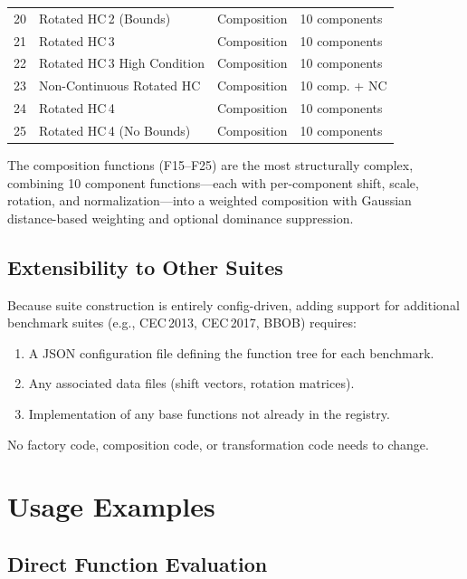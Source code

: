 \documentclass[11pt,a4paper]{article}
\begin{document}
\begin{table}[t]
\begin{tabular}{@{}clll@{}}
20 & Rotated HC\,2 (Bounds)                & Composition   & 10 components \\
21 & Rotated HC\,3                         & Composition   & 10 components \\
22 & Rotated HC\,3 High Condition          & Composition   & 10 components \\
23 & Non-Continuous Rotated HC             & Composition   & 10 comp. + NC \\
24 & Rotated HC\,4                         & Composition   & 10 components \\
25 & Rotated HC\,4 (No Bounds)             & Composition   & 10 components \\
\bottomrule
\end{tabular}
\end{table}

The composition functions (F15--F25) are the most structurally complex,
combining 10 component functions---each with per-component shift, scale,
rotation, and normalization---into a weighted composition with Gaussian
distance-based weighting and optional dominance suppression.

\subsection{Extensibility to Other Suites}

Because suite construction is entirely config-driven, adding support for
additional benchmark suites (e.g., CEC\,2013, CEC\,2017, BBOB) requires:
\begin{enumerate}[nosep]
  \item A JSON configuration file defining the function tree for each benchmark.
  \item Any associated data files (shift vectors, rotation matrices).
  \item Implementation of any base functions not already in the registry.
\end{enumerate}

No factory code, composition code, or transformation code needs to change.

\section{Usage Examples}\label{sec:usage}

\subsection{Direct Function Evaluation}
\end{document}
